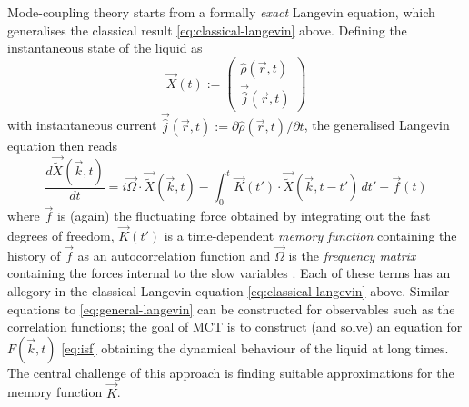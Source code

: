 \documentclass[11pt,twoside]{report}
\begin{document}
Mode-coupling theory starts from a formally \emph{exact} Langevin equation, which generalises the classical result \eqref{eq:classical-langevin} above.
Defining the instantaneous state of the liquid as
\begin{equation*}
  \vec{X}(t) := \begin{pmatrix} \hat\rho(\vec{r}, t) \\ \vec{\hat{j}}(\vec{r}, t) \end{pmatrix}
\end{equation*}
with instantaneous current $\vec{\hat{j}}(\vec{r}, t) := \partial \hat\rho(\vec{r}, t) / \partial t$, the generalised Langevin equation then reads \cite{ReichmanJSM2005, JanssenFP2018}
\begin{equation}\label{eq:general-langevin}
  \frac{d \vec{\widetilde{X}}(\vec{k}, t)}{dt}
  =
  i \vec{\Omega} \cdot \vec{\widetilde{X}}(\vec{k}, t)
  - \int_0^t \vec{K}(t') \cdot \vec{\widetilde{X}}(\vec{k}, t - t') \, dt'
  + \vec{f}(t)
\end{equation}
where $\vec{f}$ is (again) the fluctuating force obtained by integrating out the fast degrees of freedom, $\vec{K}(t')$ is a time-dependent \emph{memory function} containing the history of $\vec{f}$ as an autocorrelation function \cite{ReichmanJSM2005} and $\vec{\Omega}$ is the \emph{frequency matrix} containing the forces internal to the slow variables \cite{JanssenFP2018}.
Each of these terms has an allegory in the classical Langevin equation \eqref{eq:classical-langevin} above.
Similar equations to \eqref{eq:general-langevin} can be constructed for observables such as the correlation functions; the goal of MCT is to construct (and solve) an equation for $F(\vec{k}, t)$ \eqref{eq:isf} obtaining the dynamical behaviour of the liquid at long times.
The central challenge of this approach is finding suitable approximations for the memory function $\vec{K}$.
\end{document}
